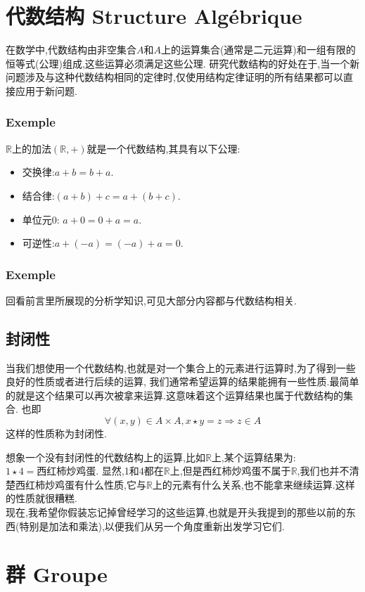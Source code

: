 \documentclass[12pt, a4paper, oneside]{ctexbook}
\begin{document}
\section{代数结构 Structure Algébrique}
  在数学中,代数结构由非空集合$A$和$A$上的运算集合(通常是二元运算)和一组有限的恒等式(公理)组成,这些运算必须满足这些公理.
  研究代数结构的好处在于,当一个新问题涉及与这种代数结构相同的定律时,仅使用结构定律证明的所有结果都可以直接应用于新问题.
  \subsubsection{Exemple}
  $\mathbb{R}$上的加法$(\mathbb{R},+)$就是一个代数结构,其具有以下公理:
  \begin{itemize}
    \item 交换律:$a+b=b+a$.
    \item 结合律:$(a+b)+c=a+(b+c)$.
    \item 单位元0:  $a+0=0+a=a$.
    \item 可逆性:$a+(-a)=(-a)+a=0$.
  \end{itemize}
  \subsubsection{Exemple}
  回看前言里所展现的分析学知识,可见大部分内容都与代数结构相关.
  \subsection{封闭性}
  当我们想使用一个代数结构,也就是对一个集合上的元素进行运算时,为了得到一些良好的性质或者进行后续的运算,
  我们通常希望运算的结果能拥有一些性质.最简单的就是这个结果可以再次被拿来运算.这意味着这个运算结果也属于代数结构的集合.
  也即$$\forall (x,y)\in A\times A, x\star y=z \Rightarrow z\in A$$这样的性质称为封闭性.


  想象一个没有封闭性的代数结构上的运算,比如$\mathbb{R}$上,某个运算结果为:$1\star 4=\text{西红柿炒鸡蛋}$.
  显然,1和4都在$\mathbb{R}$上,但是西红柿炒鸡蛋不属于$\mathbb{R}$,我们也并不清楚西红柿炒鸡蛋有什么性质,它与$\mathbb{R}$上的元素有什么关系,也不能拿来继续运算.这样的性质就很糟糕.\\
  
  现在,我希望你假装忘记掉曾经学习的这些运算,也就是开头我提到的那些以前的东西(特别是加法和乘法),以便我们从另一个角度重新出发学习它们.

\section{群 Groupe}
\end{document}

